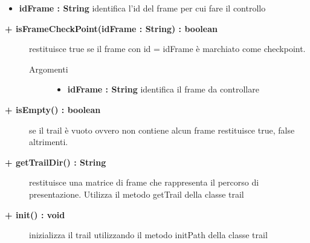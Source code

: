 \begin{description}
\begin{description}
\begin{description}
\begin{itemize}
					\item \textbf{idFrame : String			} \hfill
						identifica l'id del frame per cui fare il controllo
					
				\end{itemize}
		\end{description}
	\end{description}
	
	\begin{description}
		\item[\textbf{\color{blue}+ isFrameCheckPoint(idFrame : String) : boolean			}] \hfill
			restituisce true se il frame con id = idFrame è marchiato come checkpoint.
			
		\begin{description}
			\item[Argomenti] \hfill
				\begin{itemize}
				
					\item \textbf{idFrame : String			} \hfill
						identifica il frame da controllare
					
				\end{itemize}
		\end{description}
	\end{description}
	
	\begin{description}
		\item[\textbf{\color{blue}+ isEmpty() : boolean			}] \hfill
			se il trail è vuoto ovvero non contiene alcun frame restituisce true, false altrimenti.
			
	\end{description}
	
	\begin{description}
		\item[\textbf{\color{blue}+ getTrailDir() : String			}] \hfill
			restituisce una matrice di frame che rappresenta il percorso di presentazione. Utilizza il metodo getTrail della classe trail

	\end{description}
	
	\begin{description}
		\item[\textbf{\color{blue}+ init() : void			}] \hfill
			inizializza il trail utilizzando il metodo initPath della classe trail
		
	\end{description}
		
\end{description}

